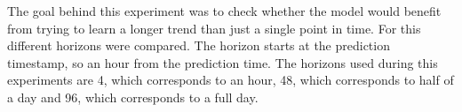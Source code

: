 \documentclass[class=scrbook, crop=false]{standalone}
\begin{document}
The goal behind this experiment was to check whether the model would benefit from trying to learn a longer trend than just a single point in time.
For this different horizons were compared. The horizon starts at the prediction timestamp, so an hour from the prediction time.
The horizons used during this experiments are 4, which corresponds to an hour, 48, which corresponds to half of a day and 96, which corresponds to a full day.
\end{document}
